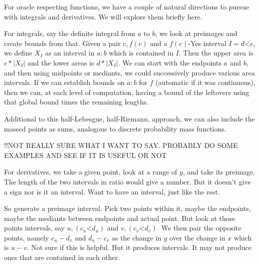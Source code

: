 \documentclass[12pt]{article}
\theoremstyle{remark}
\newcommand{\lt}{\mathord{<}}
\begin{document}
For oracle respecting functions, we have a couple of natural directions to pursue with integrals and derivatives. We will explore them briefly here. 

For integrals, say the definite integral from $a$ to $b$, we look at preimages and create bounds from that. Given a pair $c, f(c)$ and a $f(c)$-Yes interval $I=d\lt e$, we define $X_I$ as an interval in $a:b$ which is contained in $I$. Then the upper area is $e*|X_I|$ and the lower areas is $d*|X_I|$. We can start with the endpoints $a$ and $b$, and then using midpoints or mediants, we could successively produce various area intervals. If we can establish bounds on $a:b$ for $f$ (automatic if it was continuous), then we can, at each level of computation, having a bound of the leftovers using that global bound times the remaining lengths.

Additional to this half-Lebesgue, half-Riemann, approach, we can also include the massed points as sums, analogous to discrete probability mass functions. 

!!NOT REALLY SURE WHAT I WANT TO SAY. PROBABLY DO SOME EXAMPLES AND SEE IF IT IS USEFUL OR NOT

For derivatives, we take a given point, look at a range of $y$, and take its preimage. The length of the two intervals in ratio would give a number. But it doesn't give a sign nor is it an interval. Want to have an interval, just like the rest. 

So generate a preimage interval. Pick two points within it, maybe the endpoints, maybe the mediants between endpoints and actual point. But look at those points intervals, say $u, (c_u\lt d_u)$ and $v, (c_v\lt d_v)$. We then pair the opposite points, namely $c_u - d_v$ and $d_u - c_v$ as the change in $y$ over the change in $x$ which is $u-v$. Not sure if this is helpful.  But it produces intervals. It may not produce ones that are contained in each other. 


\medskip

\printbibliography
\end{document}
